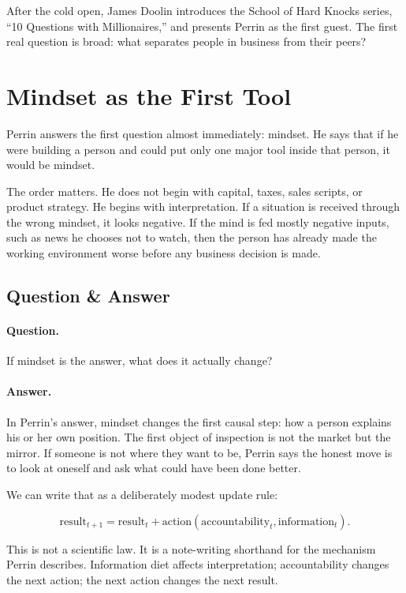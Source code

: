 After the cold open, James Doolin introduces the School of Hard Knocks series, ``10 Questions with Millionaires,'' and presents Perrin as the first guest. The first real question is broad: what separates people in business from their peers?

\section{Mindset as the First Tool}

Perrin answers the first question almost immediately: mindset. He says that if he were building a person and could put only one major tool inside that person, it would be mindset.

The order matters. He does not begin with capital, taxes, sales scripts, or product strategy. He begins with interpretation. If a situation is received through the wrong mindset, it looks negative. If the mind is fed mostly negative inputs, such as news he chooses not to watch, then the person has already made the working environment worse before any business decision is made.

\subsection{Question \& Answer}

\paragraph{Question.}
If mindset is the answer, what does it actually change?

\paragraph{Answer.}
In Perrin's answer, mindset changes the first causal step: how a person explains his or her own position. The first object of inspection is not the market but the mirror. If someone is not where they want to be, Perrin says the honest move is to look at oneself and ask what could have been done better.

We can write that as a deliberately modest update rule:

\begin{equation}
\mathrm{result}_{t+1}
=
\mathrm{result}_{t}
+
\mathrm{action}(\mathrm{accountability}_{t},\mathrm{information}_{t}).
\end{equation}

This is not a scientific law. It is a note-writing shorthand for the mechanism Perrin describes. Information diet affects interpretation; accountability changes the next action; the next action changes the next result.

